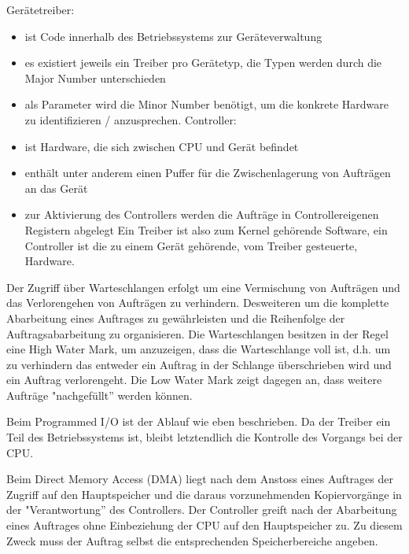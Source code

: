 \begin{answer}
  Gerätetreiber:
  \begin{itemize}
   \item ist Code innerhalb des Betriebssystems zur Geräteverwaltung
  \item es existiert jeweils ein Treiber pro Gerätetyp, die Typen werden durch die Major Number unterschieden
  \item als Parameter wird die Minor Number benötigt, um die konkrete Hardware zu identifizieren / anzusprechen. Controller:
  \item ist Hardware, die sich zwischen CPU und Gerät befindet
  \item enthält unter anderem einen Puffer für die Zwischenlagerung von Aufträgen an das Gerät
  \item zur Aktivierung des Controllers werden die Aufträge in Controllereigenen Registern abgelegt Ein Treiber ist also zum Kernel gehörende Software, ein Controller ist die zu einem Gerät gehörende, vom Treiber gesteuerte, Hardware.
  \end{itemize}

\end{answer}

\begin{answer}
  Der Zugriff über Warteschlangen erfolgt um eine Vermischung von Aufträgen und das Verlorengehen von Aufträgen zu verhindern. Desweiteren um die komplette Abarbeitung eines Auftrages zu gewährleisten und die Reihenfolge der Auftragsabarbeitung zu organisieren.
  Die Warteschlangen besitzen in der Regel eine High Water Mark, um anzuzeigen, dass die Warteschlange voll ist, d.h. um zu verhindern das entweder ein Auftrag in der Schlange überschrieben wird und ein Auftrag verlorengeht. Die Low Water Mark zeigt dagegen an, dass weitere Aufträge "nachgefüllt'' werden können.
\end{answer}

\begin{answer}
  Beim Programmed I/O ist der Ablauf wie eben beschrieben. Da der Treiber ein Teil des Betriebssystems ist, bleibt letztendlich die Kontrolle des Vorgangs bei der CPU. 
  
  Beim Direct Memory Access (DMA) liegt nach dem Anstoss eines Auftrages der Zugriff auf den
  Hauptspeicher und die daraus vorzunehmenden Kopiervorgänge in der "Verantwortung'' des Controllers.
  Der Controller greift nach der Abarbeitung eines Auftrages ohne Einbeziehung der CPU
  auf den Hauptspeicher zu. Zu diesem Zweck muss der Auftrag selbst die entsprechenden Speicherbereiche
  angeben.
\end{answer}

